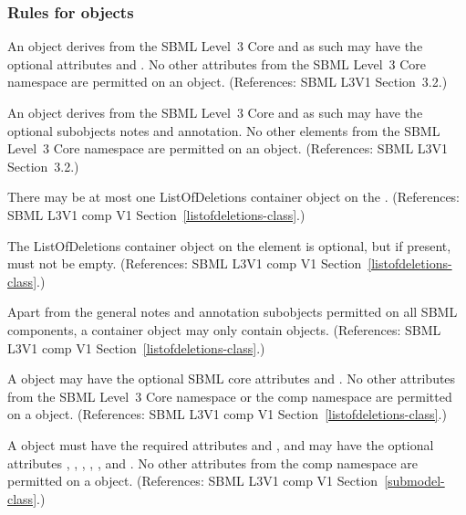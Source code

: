 \begin{sbmlenum}
\end{sbmlenum} \subsubsection*{Rules for  objects} \begin{sbmlenum}

 { An \Submodel object derives from the SBML
  Level~3 Core  and as such may have the optional attributes
   and . No other attributes from the SBML
  Level~3 Core namespace are permitted on an \Submodel object.
  (References: SBML L3V1 Section~3.2.) }
   

 { An \Submodel object derives from the SBML
  Level~3 Core  and as such may have the optional subobjects
  notes and annotation. No other elements from the SBML
  Level~3 Core namespace are permitted on an \Submodel object.
  (References: SBML L3V1 Section~3.2.) }
   

 { There may be at most one ListOfDeletions container
  object on the \Submodel. 
  (References: SBML L3V1 comp V1 Section~\ref{listofdeletions-class}.) }


 { The ListOfDeletions container object on 
  the \Submodel element is optional, but if present, must not be empty. 
  (References: SBML L3V1 comp V1 Section~\ref{listofdeletions-class}.) }
  

 { Apart from the general notes and annotation
  subobjects permitted on all SBML components, a \ListOfDeletions
  container object may only contain \Deletion objects.
  (References: SBML L3V1 comp V1 Section~\ref{listofdeletions-class}.) }


 { A \ListOfDeletions object may have the optional 
  SBML core attributes  and .  No other attributes 
  from the SBML Level~3 Core namespace or the comp namespace are permitted on 
  a \ListOfDeletions object.
  (References: SBML L3V1 comp V1 Section~\ref{listofdeletions-class}.) }


 { A \Submodel object must have the
  required attributes  and , and may have
  the optional attributes ,
  , ,
  , , and
  .
  No other attributes from the comp namespace are permitted on a
  \Submodel object.
  (References: SBML L3V1 comp V1 Section~\ref{submodel-class}.) }



\end{sbmlenum}
